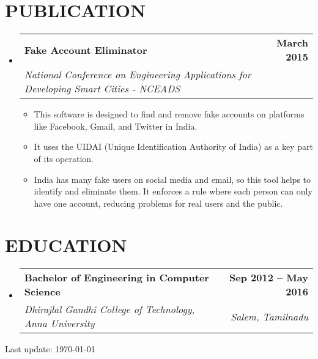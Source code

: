 \documentclass[letterpaper,11pt]{article}
\makeatletter
\newcommand{\resumeItem}[1]{
  \item\small{
    {#1 \vspace{-2pt}}
  }
}
\newcommand{\resumeSubheading}[4]{
  \vspace{-2pt}\item
    \begin{tabular*}{1.0\textwidth}[t]{l@{\extracolsep{\fill}}r}
      \textbf{#1} & \textbf{\small #2} \\
      \textit{\small#3} & \textit{\small #4} \\
    \end{tabular*}\vspace{-7pt}
}
\newcommand{\resumeSubHeadingListStart}{\begin{itemize}[leftmargin=0.0in, label={}]}
\newcommand{\resumeSubHeadingListEnd}{\end{itemize}}
\newcommand{\resumeItemListStart}{\begin{itemize}}
\newcommand{\resumeItemListEnd}{\end{itemize}\vspace{-5pt}}
\makeatother
\begin{document}
\section{PUBLICATION}
    \resumeSubHeadingListStart
        \resumeSubheading{Fake Account Eliminator}{March 2015}{National Conference on Engineering Applications for Developing Smart Cities - NCEADS}{}
            \resumeItemListStart
                \resumeItem{This software is designed to find and remove fake accounts on platforms like Facebook, Gmail, and Twitter in India.}
                \resumeItem{It uses the UIDAI (Unique Identification Authority of India) as a key part of its operation.}
                \resumeItem{India has many fake users on social media and email, so this tool helps to identify and eliminate them. It enforces a rule where each person can only have one account, reducing problems for real users and the public.}
            \resumeItemListEnd
    \resumeSubHeadingListEnd

\section{EDUCATION}
  \resumeSubHeadingListStart
    \resumeSubheading
      {Bachelor of Engineering in Computer Science }{Sep 2012 -- May 2016}
      {Dhirajlal Gandhi College of Technology, Anna University}{Salem, Tamilnadu}
  \resumeSubHeadingListEnd
  
\vspace{200pt} %
\begin{center}
    Last update: \today
\end{center}
     
\end{document}
